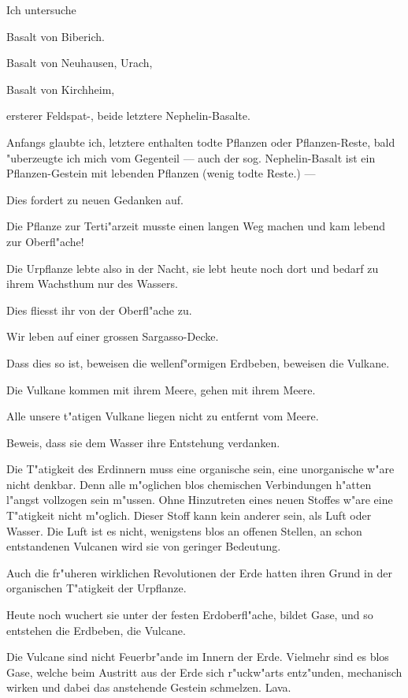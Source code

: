 \documentclass[a4paper, 11pt, oneside, german]{article}
\begin{document}
Ich untersuche

Basalt von Biberich.

Basalt von Neuhausen, Urach,

Basalt von Kirchheim,

ersterer Feldspat-, beide letztere Nephelin-Basalte.

Anfangs glaubte ich, letztere enthalten todte Pflanzen oder Pflanzen-Reste, bald "uberzeugte ich mich vom Gegenteil --- auch der sog. Nephelin-Basalt ist ein Pflanzen-Gestein mit lebenden Pflanzen (wenig todte Reste.) ---

Dies fordert zu neuen Gedanken auf.

Die Pflanze zur Terti"arzeit musste einen langen Weg machen und kam lebend zur Oberfl"ache!

Die Urpflanze lebte also in der Nacht, sie lebt heute noch dort und bedarf zu ihrem Wachsthum nur des Wassers.

Dies fliesst ihr von der Oberfl"ache zu.

Wir leben auf einer grossen Sargasso-Decke.

Dass dies so ist, beweisen die wellenf"ormigen Erdbeben, beweisen die Vulkane.

Die Vulkane kommen mit ihrem Meere, gehen mit ihrem Meere.

Alle unsere t"atigen Vulkane liegen nicht zu entfernt vom Meere.

Beweis, dass sie dem Wasser ihre Entstehung verdanken.

Die T"atigkeit des Erdinnern muss eine organische sein, eine unorganische w"are nicht denkbar. Denn alle m"oglichen blos chemischen Verbindungen h"atten l"angst vollzogen sein m"ussen. Ohne Hinzutreten eines neuen Stoffes w"are eine T"atigkeit nicht m"oglich. Dieser Stoff kann kein anderer sein, als Luft oder Wasser. Die Luft ist es nicht, wenigstens blos an offenen Stellen, an schon entstandenen Vulcanen wird sie von geringer Bedeutung.

Auch die fr"uheren wirklichen Revolutionen der Erde hatten ihren Grund in der organischen T"atigkeit der Urpflanze.

Heute noch wuchert sie unter der festen Erdoberfl"ache, bildet Gase, und so entstehen die Erdbeben, die Vulcane.

Die Vulcane sind nicht Feuerbr"ande im Innern der Erde. Vielmehr sind es blos Gase, welche beim Austritt aus der Erde sich r"uckw"arts entz"unden, mechanisch wirken und dabei das anstehende Gestein schmelzen. Lava.
\end{document}
